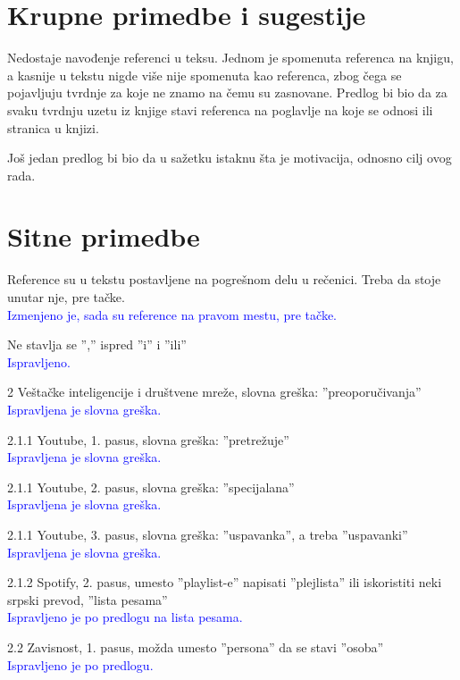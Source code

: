 \documentclass[a4paper]{report}
\newcommand{\odgovor}[1]{\textcolor{blue}{#1}}
\begin{document}
\section{Krupne primedbe i sugestije}
Nedostaje navođenje referenci u teksu. Jednom je spomenuta referenca na knjigu, a kasnije u tekstu nigde više nije spomenuta kao referenca, zbog čega se pojavljuju tvrdnje za koje ne znamo na čemu su zasnovane. Predlog bi bio da za svaku tvrdnju uzetu iz knjige stavi referenca na poglavlje na koje se odnosi ili stranica u knjizi.

Još jedan predlog bi bio da u sažetku istaknu šta je motivacija, odnosno cilj ovog rada.


\section{Sitne primedbe}
Reference su u tekstu postavljene na pogrešnom delu u rečenici. Treba da stoje unutar nje, pre tačke. \\
\odgovor{Izmenjeno je, sada su reference na pravom mestu, pre tačke.}

Ne stavlja se '','' ispred ''i'' i ''ili'' \\
\odgovor{Ispravljeno.}

2 Veštačke inteligencije i društvene mreže, slovna greška: ''preoporučivanja'' \\
\odgovor{Ispravljena je slovna greška.}

2.1.1 Youtube, 1. pasus, slovna greška: ''pretrežuje'' \\
\odgovor{Ispravljena je slovna greška.}


2.1.1 Youtube, 2. pasus, slovna greška: ''specijalana'' \\
\odgovor{Ispravljena je slovna greška.}


2.1.1 Youtube, 3. pasus, slovna greška: ''uspavanka'', a treba ''uspavanki'' \\
\odgovor{Ispravljena je slovna greška.}


2.1.2 Spotify, 2. pasus, umesto ''playlist-e'' napisati ''plejlista'' ili iskoristiti neki srpski prevod, ''lista pesama'' \\
\odgovor{Ispravljeno je po predlogu na lista pesama.}

2.2 Zavisnost, 1. pasus, možda umesto ''persona'' da se stavi ''osoba'' \\
\odgovor{Ispravljeno je po predlogu.}
\end{document}
